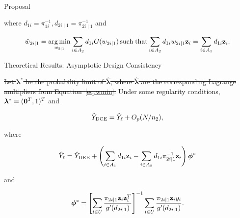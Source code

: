 \documentclass[final]{beamer}
\DeclareMathOperator*{\argmin}{arg\,min}
\DeclareMathOperator*{\suchthat}{such\; that}
\newlength{\colwidth}
\begin{document}
\begin{frame}[t]
\begin{columns}[t]
\begin{column}{\colwidth}
\begin{alertblock}{Proposal}
    \vspace{-1.0cm}

    where $d_{1i} = \pi_{1i}^{-1}, d_{2i \mid 1}= \pi_{2i \mid 1}^{-1}$ and 
    \vspace{-0.5cm}

    \begin{equation}\label{eq:wmin}
    \hat w_{2i|1} = \argmin_{w_{2|1}} \sum_{i \in A_2} d_{1i} G(w_{2i|1})
    \suchthat \sum_{i \in A_2} d_{1i} w_{2i|1} {\bf{z}}_i = 
    \sum_{i \in A_1} d_{1i} {\bf{z}}_i.
    \end{equation}
    
    \vspace{-0.5cm}
  \end{alertblock}

  \begin{exampleblock}{Theoretical Results: Asymptotic Design Consistency}

   \sout{Let $\bm \lambda^*$ be the probability limit of $\hat{\bm \lambda}$,
    where $\hat{\bm \lambda}$ are the corresponding Lagrange multipliers from
    Equation~\ref{eq:wmin}.}
    Under some regularity conditions, \sout{$\bm \lambda^* = ({\bf 0}^T, 1)^T$} and

    $$\hat Y_{\rm{DCE}} = \hat Y_\ell + O_p(N / n_2), $$

    where 
    \vspace{-1.3cm}

    $$\hat Y_{\ell} = \hat Y_{\rm{DEE}}+ 
    \left(\sum_{i \in A_1} d_{1i} {\bf z}_i - \sum_{i \in A_2} d_{1i} 
    \pi_{2i \mid 1}^{-1}  {\bf z}_i \right)\bm \phi^*$$

    \vspace{-1.3cm}
    and
    \vspace{-0.3cm}

    $$
    \bm \phi^* = 
    \left[\sum_{i \in U} \frac{\pi_{2i|1}{\bf z}_i {\bf z}_i^T}{g'(d_{2i|1})}\right]^{-1}
    \sum_{i \in U} \frac{\pi_{2i|1}{\bf z}_i y_i}{g'(d_{2i|1})}.
    $$

    \vspace{-0.5cm}

  \end{exampleblock}

\end{column}


\end{columns}
\end{frame}
\end{document}
